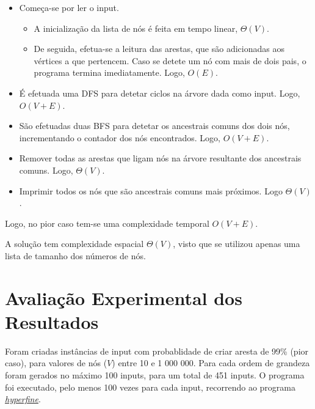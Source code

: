 \documentclass[12pt,a4paper]{article}
\begin{document}
  \begin{itemize}
    \setlength{\itemsep}{0pt}
    \item Começa-se por ler o input.
    \begin{itemize}
      \setlength{\itemsep}{0pt}
      \item A inicialização da lista de nós é feita em tempo linear, $\Theta(V)$.
      \item De seguida, efetua-se a leitura das arestas, que são adicionadas aos vértices a que pertencem.
      Caso se detete um nó com mais de dois pais, o programa termina imediatamente. Logo, $O(E)$.
    \end{itemize}

  \item É efetuada uma DFS para detetar ciclos na árvore dada como input. Logo, $O(V + E)$.

  \item São efetuadas duas BFS para detetar os ancestrais comuns dos dois nós, incrementando o contador dos nós encontrados. Logo, $O(V + E)$.

  \item Remover todas as arestas que ligam nós na árvore resultante dos ancestrais comuns. Logo, $\Theta(V)$.

  \item Imprimir todos os nós que são ancestrais comuns mais próximos. Logo $\Theta(V)$.
  \end{itemize}

  Logo, no pior caso tem-se uma complexidade temporal $O(V + E)$.

  A solução tem complexidade espacial $\Theta(V)$, visto que se utilizou apenas uma lista de tamanho dos números de nós.

  \section{Avaliação Experimental dos Resultados}

  Foram criadas instâncias de input com probablidade de criar aresta de 99\% (pior caso), para valores de nós ($V$) entre 10 e 1 000 000. Para cada ordem de grandeza foram gerados no máximo 100 inputs, para um total de 451 inputs.
  O programa foi executado, pelo menos 100 vezes para cada input, recorrendo ao programa \href{https://github.com/sharkdp/hyperfine}{\textit{hyperfine}}.
    
\end{document}
